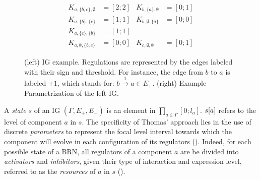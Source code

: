 \begin{figure}[t]
\begin{minipage}{0.4\linewidth}
\centering
{}
\end{minipage}
\begin{minipage}{0.6\linewidth}
\centering
\begin{align*}
K_{a,\{b,c\},\emptyset} &= [2 ; 2] & K_{b,\{a\},\emptyset} &= [0 ; 1] \\
K_{a,\{b\},\{c\}} &= [1 ; 1] & K_{b,\emptyset,\{a\}} &= [0 ; 0] \\
K_{a,\{c\},\{b\}} &= [1 ; 1] &&\\
K_{a,\emptyset,\{b,c\}} &= [0 ; 0] & K_{c,\emptyset,\emptyset} &= [0 ; 1]
\end{align*}
\end{minipage}
\caption{\label{fig:runningBRN}
(left)
IG example.
Regulations are represented by the edges labeled with their sign and threshold.
For instance, the edge from $b$ to $a$ is labeled $+1$, which stands for: $b \xrightarrow{1} a \in
E_+$.
(right)
Example Parametrization of the left IG.
}
\end{figure}

A \emph{state} $s$ of an IG $(\Gamma, E_+, E_-)$ is an element in $\prod_{a \in \Gamma} [0;l_a]$.
${s[a]}$ refers to the level of component $a$ in $s$.
The specificity of Thomas' approach lies in the use of discrete \emph{parameters} to represent the
focal level interval towards which the component will evolve in each configuration of its regulators
().
Indeed, for each possible state of a BRN, all regulators of a component $a$ are be divided into
\emph{activators} and \emph{inhibitors}, given their type of interaction and expression level,
referred to as the \emph{resources} of $a$ in $s$ ().

